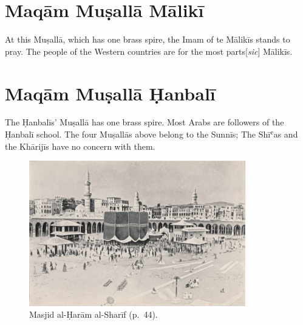 \section*{Maqām Muṣallā Mālikī}

At this Muṣallā, which has one brass spire, the Imam of te Mālikīs stands to pray. The people of the Western countries are for the most parts[\textit{sic}] Mālikīs.

\section*{Maqām Muṣallā Ḥanbalī}

The Ḥanbalīs' Muṣallā has one brass spire. Most Arabs are followers of the Ḥanbalī school. The four Muṣallās above belong to the Sunnīs; The Shīʿas and the Khārijīs have no concern with them.

\begin{figure}[h]
  \begin{center}
    \includegraphics[width=0.84\textwidth]{images/haram1}
  \end{center}
  \caption*{Masjid al-Ḥarām al-Sharīf (p.\ 44).}
\end{figure}